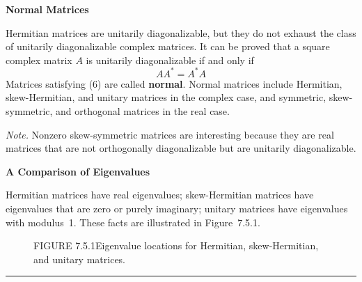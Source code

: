 \documentclass{article}
\newcommand{\redheading}[1]{{\vspace{2mm}\noindent\Large\bfseries\color{red!55!black} #1\par}\vspace{2mm}}
\begin{document}
\redheading{Normal Matrices}

Hermitian matrices are unitarily diagonalizable, but they do not exhaust the class of unitarily diagonalizable complex matrices. It can be proved that a square complex matrix $A$ is unitarily diagonalizable if and only if
\begin{equation}
  AA^* = A^*A
\end{equation}
Matrices satisfying (6) are called \textbf{normal}. Normal matrices include Hermitian, skew-Hermitian, and unitary matrices in the complex case, and symmetric, skew-symmetric, and orthogonal matrices in the real case.

\textit{Note.} Nonzero skew-symmetric matrices are interesting because they are real matrices that are not orthogonally diagonalizable but are unitarily diagonalizable.

\redheading{A Comparison of Eigenvalues}

Hermitian matrices have real eigenvalues; skew-Hermitian matrices have eigenvalues that are zero or purely imaginary; unitary matrices have eigenvalues with modulus~1. These facts are illustrated in Figure~7.5.1.

\begin{figure}[ht]
\centering
{}
\caption*{FIGURE 7.5.1\quad Eigenvalue locations for Hermitian, skew-Hermitian, and unitary matrices.}
\end{figure}

\vspace{3mm}
\noindent\rule{\linewidth}{0.5pt}
\end{document}
